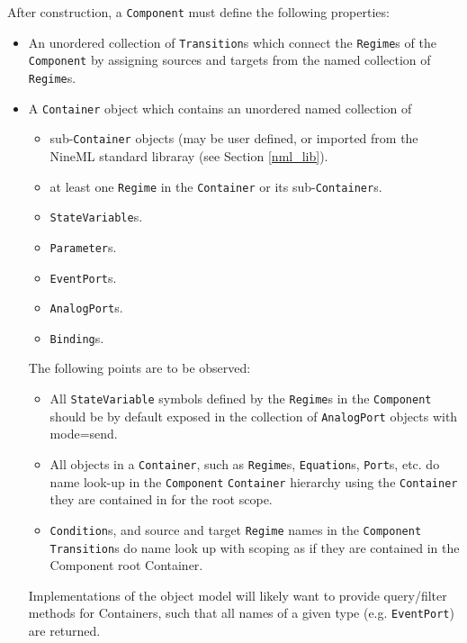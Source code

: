 \documentclass[a4paper]{article}
\newcommand\nmlClass[1]{{\tt #1}}
\begin{document}
After construction, a \nmlClass{Component} must define the following properties:
\begin{itemize}
\item An unordered collection of \nmlClass{Transition}s which connect the \nmlClass{Regime}s
  of the \nmlClass{Component} by assigning sources and targets from the named
  collection of \nmlClass{Regime}s. 

\item A \nmlClass{Container} object which contains an unordered named collection of 
\begin{itemize}
\item sub-\nmlClass{Container} objects (may be user defined, or imported from the NineML standard libraray (see Section \ref{nml_lib}).
\item at least one \nmlClass{Regime} in the \nmlClass{Container} or its sub-\nmlClass{Container}s.
\item \nmlClass{StateVariable}s.
\item \nmlClass{Parameter}s.
\item \nmlClass{EventPort}s.
\item \nmlClass{AnalogPort}s.
\item \nmlClass{Binding}s.
\end{itemize}

The following points are to be observed:
\begin{itemize}
\item All \nmlClass{StateVariable} symbols defined by the
  \nmlClass{Regime}s in the \nmlClass{Component} should be by default
  exposed in the collection of \nmlClass{AnalogPort} objects with
  mode=send.
\item All objects in a \nmlClass{Container}, such as
  \nmlClass{Regime}s, \nmlClass{Equation}s, \nmlClass{Port}s, etc. do
  name look-up in the \nmlClass{Component} \nmlClass{Container}
  hierarchy using the \nmlClass{Container} they are contained in for
  the root scope.
\item \nmlClass{Condition}s, and source and target \nmlClass{Regime}
  names in the \nmlClass{Component} \nmlClass{Transition}s do name
  look up with scoping as if they are contained in the Component root
  Container.
\end{itemize}

Implementations of the object model will likely want to provide
query/filter methods for Containers, such that all names of a given
type (e.g. \nmlClass{EventPort}) are returned.

\end{itemize}
\end{document}

